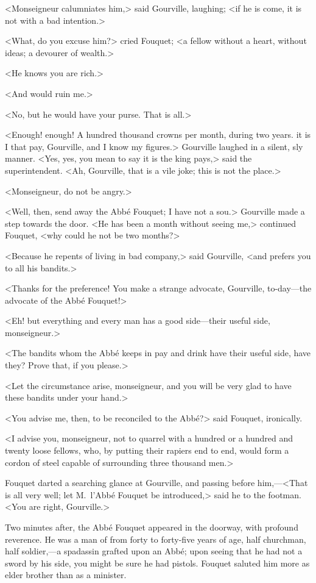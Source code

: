 <Monseigneur calumniates him,> said Gourville, laughing; <if he is come, it is not with a bad intention.>

<What, do you excuse him?> cried Fouquet; <a fellow without a heart, without ideas; a devourer of wealth.>

<He knows you are rich.>

<And would ruin me.>

<No, but he would have your purse. That is all.>

<Enough! enough! A hundred thousand crowns per month, during two years.  it is I that pay, Gourville, and I know my figures.> Gourville laughed in a silent, sly manner. <Yes, yes, you mean to say it is the king pays,> said the superintendent. <Ah, Gourville, that is a vile joke; this is not the place.>

<Monseigneur, do not be angry.>

<Well, then, send away the Abbé Fouquet; I have not a sou.> Gourville made a step towards the door. <He has been a month without seeing me,> continued Fouquet, <why could he not be two months?>

<Because he repents of living in bad company,> said Gourville, <and prefers you to all his bandits.>

<Thanks for the preference! You make a strange advocate, Gourville, to-day—the advocate of the Abbé Fouquet!>

<Eh! but everything and every man has a good side—their useful side, monseigneur.>

<The bandits whom the Abbé keeps in pay and drink have their useful side, have they? Prove that, if you please.>

<Let the circumstance arise, monseigneur, and you will be very glad to have these bandits under your hand.>

<You advise me, then, to be reconciled to the Abbé?> said Fouquet, ironically.

<I advise you, monseigneur, not to quarrel with a hundred or a hundred and twenty loose fellows, who, by putting their rapiers end to end, would form a cordon of steel capable of surrounding three thousand men.>

Fouquet darted a searching glance at Gourville, and passing before him,—<That is all very well; let M.~l'Abbé Fouquet be introduced,> said he to the footman. <You are right, Gourville.>

Two minutes after, the Abbé Fouquet appeared in the doorway, with profound reverence. He was a man of from forty to forty-five years of age, half churchman, half soldier,—a spadassin grafted upon an Abbé; upon seeing that he had not a sword by his side, you might be sure he had pistols. Fouquet saluted him more as elder brother than as a minister.

